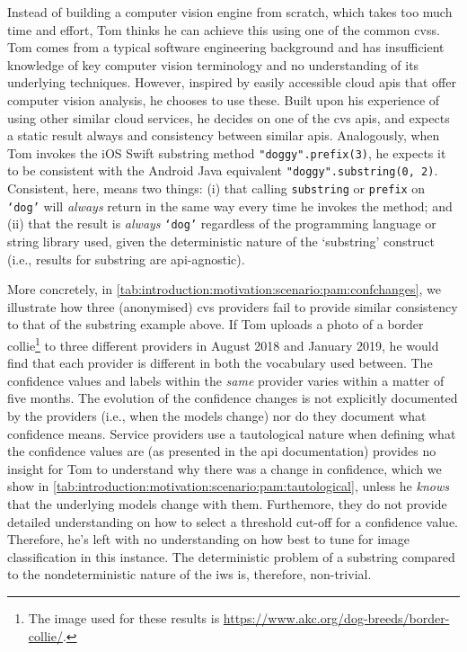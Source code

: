 Instead of building a computer vision engine from scratch, which takes too much time and effort, Tom thinks he can achieve this using one of the common \glspl{cvs}. Tom comes from a typical software engineering background and has insufficient knowledge of key computer vision terminology and no understanding of its underlying techniques. However, inspired by easily accessible cloud \glspl{api} that offer computer vision analysis, he chooses to use these. Built upon his experience of using other similar cloud services, he decides on one of the \gls{cvs} \glspl{api}, and expects a static result always and consistency between similar \glspl{api}. Analogously, when Tom invokes the iOS Swift substring method \texttt{"doggy".prefix(3)}, he expects it to be consistent with the Android Java equivalent \texttt{"doggy".substring(0, 2)}. Consistent, here, means two things: (i) that calling \texttt{substring} or \texttt{prefix} on \texttt{`dog'} will \textit{always} return in the same way every time he invokes the method; and (ii) that the result is \textit{always} \texttt{`dog'} regardless of the programming language or string library used, given the deterministic nature of the `substring' construct (i.e., results for substring are \gls{api}-agnostic). 



More concretely, in \cref{tab:introduction:motivation:scenario:pam:confchanges}, we illustrate how three (anonymised) \gls{cvs} providers fail to provide similar consistency to that of the substring example above. If Tom uploads a photo of a border collie\footnote{The image used for these results is \url{https://www.akc.org/dog-breeds/border-collie/}.} to three different providers in August 2018 and January 2019, he would find that each provider is different in both the vocabulary used between. The confidence values and labels within the \textit{same} provider varies within a matter of five months. The evolution of the confidence changes is not explicitly documented by the providers (i.e., when the models change) nor do they document what confidence means. Service providers use a tautological nature when defining what the confidence values are (as presented in the \gls{api} documentation) provides no insight for Tom to understand why there was a change in confidence, which we show in \cref{tab:introduction:motivation:scenario:pam:tautological}, unless he \textit{knows} that the underlying models change with them. Furthemore, they do not provide detailed understanding on how to select a threshold cut-off for a confidence value. Therefore, he's left with no understanding on how best to tune for image classification in this instance. The deterministic problem of a substring compared to the nondeterministic nature of the \gls{iws} is, therefore, non-trivial.

